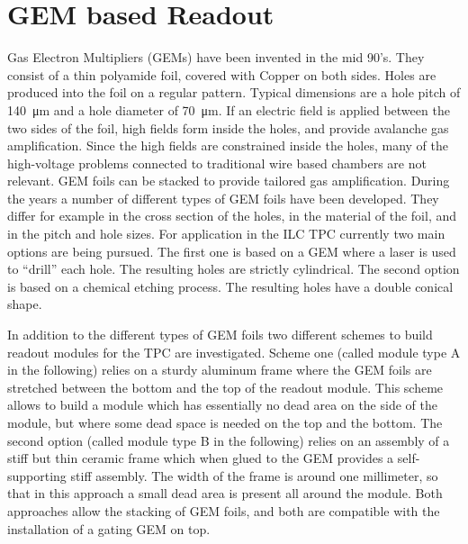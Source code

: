 \section{GEM based Readout}
\label{chap:TPC_sec:standard_gems}

Gas Electron Multipliers (GEMs) \cite{Sauli1997531} have been invented in the mid 90's. They consist of a thin polyamide foil, covered with Copper on both sides. Holes are produced into the foil on a regular pattern. Typical dimensions are a hole pitch of \SI{140}{\micro m} and a hole diameter of \SI{70}{\micro m}. If an electric field is applied between the two sides of the foil, high fields form inside the holes, and provide avalanche gas amplification. Since the high fields are constrained inside the holes, many of the high-voltage problems connected to traditional wire based chambers are not relevant. GEM foils can be stacked to provide tailored gas amplification. During the years a number of different types of GEM foils have been developed. They differ for example in the cross section of the holes, in the material of the foil, and in the pitch and hole sizes. For application in the ILC TPC currently two main options are being pursued. The first one is based on a GEM where a laser is used to ``drill'' each hole.
The resulting holes are
strictly cylindrical. The second option is based on a chemical etching process. The resulting holes have a double conical shape.

In addition to the different types of GEM foils two different schemes to build readout modules for the TPC are investigated. Scheme one (called module type A in the following) relies on a sturdy aluminum frame where the GEM foils are stretched between the bottom and the top of the readout module. This scheme allows to build a module which has essentially no dead area on the side of the module, but where some dead space is needed on the top and the bottom. The second option (called module type B in the following) relies on an assembly of a stiff but thin ceramic frame which when glued to the GEM provides a self-supporting stiff assembly. The width of the frame is around one millimeter, so that in this approach a small dead area is present all around the module. Both approaches allow the stacking of GEM foils, and both are compatible with the installation of a gating GEM on top.



